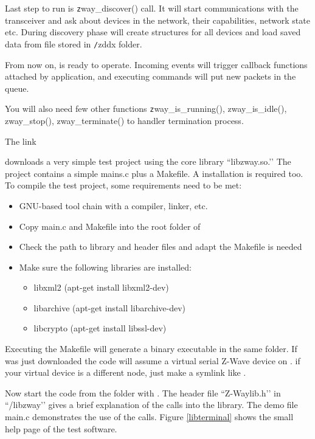Last step to run \zway is {\texttt zway\_discover()} call. It will start communications 
with the \zwave transceiver and ask about devices in the network, their capabilities, 
network state etc. During discovery phase \zway will create structures for all devices and 
load saved data from file stored in {\texttt /zddx} folder.

From now on, \zway is ready to operate. Incoming events will trigger callback functions 
attached by application, and executing commands will put new packets in the queue.

You will also need few other functions {\texttt zway\_is\_running(), zway\_is\_idle(), 
zway\_stop(), zway\_terminate()} to handler termination process.




The link

downloads a very simple test project using the \zway core library ``libzway.so.’’ 
The project contains a simple mains.c plus a Makefile. A \zway installation is required 
too. To compile the test project, some requirements need to be met:
\begin {itemize}
\item GNU-based tool chain with a compiler, linker, etc.
\item Copy main.c and Makefile into the root folder of \zway
\item Check the path to library and header files and adapt the Makefile is needed
\item Make sure the following libraries are installed:
\begin {itemize}
\item libxml2 (apt-get install libxml2-dev)
\item libarchive (apt-get install libarchive-dev)
\item libcrypto (apt-get install libssl-dev)
\end {itemize}
\end {itemize}

Executing the Makefile will generate a binary executable  in the same 
folder. If \zway was just downloaded the code will assume a virtual serial Z-Wave device 
on . if your virtual device is a different node, just make a 
symlink like .

Now start the code from the folder with . 
The header file ``Z-Waylib.h’’ in ``/libzway’’ gives a brief explanation of the calls 
into the library. The demo file main.c demonstrates the use of the calls. 
Figure \ref{libterminal} shows the small help page of the test software.

